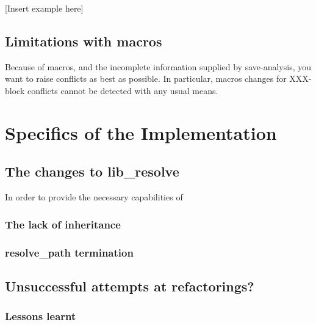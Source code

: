 [Insert example here]

\subsection{Limitations with macros}
Because of macros, and the incomplete information supplied by save-analysis, you want to raise conflicts as best as possible. In particular, macros changes for XXX-block conflicts cannot be detected with any usual means.

\section{Specifics of the Implementation}
\subsection{The changes to lib_resolve}
In order to provide the necessary capabilities of 
\subsubsection{The lack of inheritance}
\subsubsection{resolve_path termination}

\subsection{Unsuccessful attempts at refactorings?}
\subsubsection{Lessons learnt}